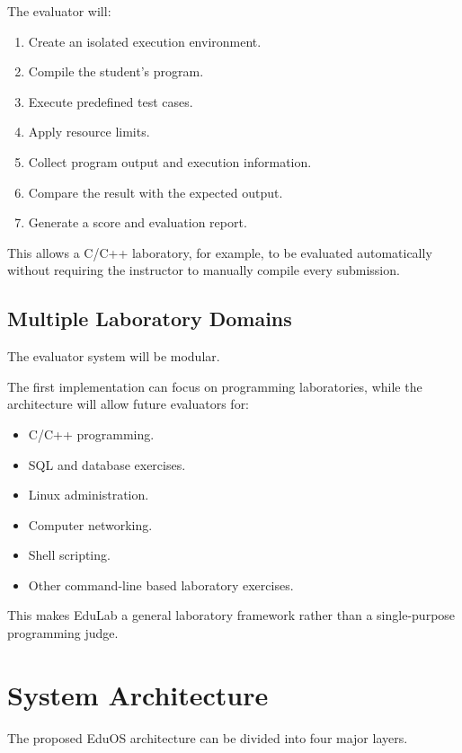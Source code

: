 \documentclass[12pt,a4paper]{article}
\begin{document}
The evaluator will:

\begin{enumerate}
    \item Create an isolated execution environment.
    \item Compile the student's program.
    \item Execute predefined test cases.
    \item Apply resource limits.
    \item Collect program output and execution information.
    \item Compare the result with the expected output.
    \item Generate a score and evaluation report.
\end{enumerate}

This allows a C/C++ laboratory, for example, to be evaluated automatically without requiring the instructor to manually compile every submission.

\subsection{Multiple Laboratory Domains}

The evaluator system will be modular.

The first implementation can focus on programming laboratories, while the architecture will allow future evaluators for:

\begin{itemize}
    \item C/C++ programming.
    \item SQL and database exercises.
    \item Linux administration.
    \item Computer networking.
    \item Shell scripting.
    \item Other command-line based laboratory exercises.
\end{itemize}

This makes EduLab a general laboratory framework rather than a single-purpose programming judge.

\section{System Architecture}

The proposed EduOS architecture can be divided into four major layers.
\end{document}

